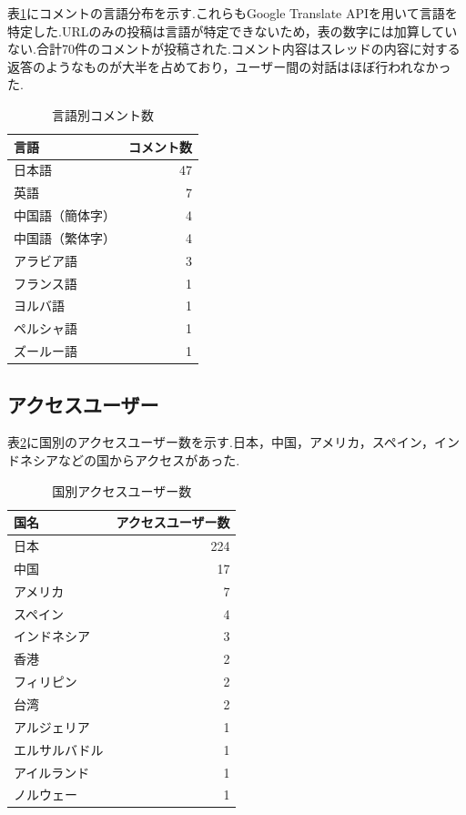 \documentclass[b5paper,12pt,dvipdfmx]{jsreport}
\begin{document}
表\ref{tab:language-detection}にコメントの言語分布を示す.これらもGoogle Translate APIを用いて言語を特定した.URLのみの投稿は言語が特定できないため，表の数字には加算していない.合計70件のコメントが投稿された.コメント内容はスレッドの内容に対する返答のようなものが大半を占めており，ユーザー間の対話はほぼ行われなかった.


\begin{table}[H]
    \centering
    \caption{言語別コメント数}
    \label{tab:language-detection}
    \begin{tabular}{|l|r|}
        \hline
        \textbf{言語} & \textbf{コメント数} \\ \hline
        日本語       & 47           \\
        英語         & 7             \\
        中国語（簡体字） & 4             \\
        中国語（繁体字） & 4             \\ 
        アラビア語     & 3             \\
        フランス語     & 1             \\
        ヨルバ語       & 1             \\
        ペルシャ語     & 1             \\
        ズールー語     & 1             \\\hline
    \end{tabular}
\end{table}

\subsection{アクセスユーザー}
表\ref{table:user-by-country}に国別のアクセスユーザー数を示す.日本，中国，アメリカ，スペイン，インドネシアなどの国からアクセスがあった.

\begin{table}[H]
    \centering
    \caption{国別アクセスユーザー数}
    \label{table:user-by-country}
    \begin{tabular}{|l|r|}
        \hline
        \textbf{国名} & \textbf{アクセスユーザー数} \\
        \hline
        日本     & 224 \\
        中国     & 17 \\
        アメリカ & 7 \\
        スペイン & 4 \\
        インドネシア & 3 \\
        香港 & 2  \\
        フィリピン   & 2  \\
        台湾 & 2 \\
        アルジェリア   & 1 \\
        エルサルバドル   & 1 \\
        アイルランド   & 1  \\
        ノルウェー & 1  \\
        \hline
    \end{tabular}
\end{table}
\end{document}
